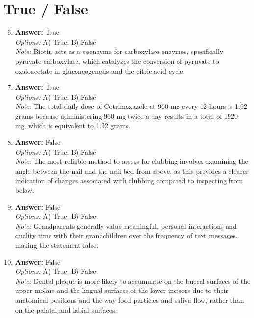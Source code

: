 \documentclass[12pt]{article}
\begin{document}
\section*{True / False}
\begin{enumerate}[label=\arabic*.]
\setcounter{enumi}{5}
\item \textbf{Answer:} True
\\ \textit{Options:} A) True; B) False
\\ \textit{Note:} Biotin acts as a coenzyme for carboxylase enzymes, specifically pyruvate carboxylase, which catalyzes the conversion of pyruvate to oxaloacetate in gluconeogenesis and the citric acid cycle.
\item \textbf{Answer:} True
\\ \textit{Options:} A) True; B) False
\\ \textit{Note:} The total daily dose of Cotrimoxazole at 960 mg every 12 hours is 1.92 grams because administering 960 mg twice a day results in a total of 1920 mg, which is equivalent to 1.92 grams.
\item \textbf{Answer:} False
\\ \textit{Options:} A) True; B) False
\\ \textit{Note:} The most reliable method to assess for clubbing involves examining the angle between the nail and the nail bed from above, as this provides a clearer indication of changes associated with clubbing compared to inspecting from below.
\item \textbf{Answer:} False
\\ \textit{Options:} A) True; B) False
\\ \textit{Note:} Grandparents generally value meaningful, personal interactions and quality time with their grandchildren over the frequency of text messages, making the statement false.
\item \textbf{Answer:} False
\\ \textit{Options:} A) True; B) False
\\ \textit{Note:} Dental plaque is more likely to accumulate on the buccal surfaces of the upper molars and the lingual surfaces of the lower incisors due to their anatomical positions and the way food particles and saliva flow, rather than on the palatal and labial surfaces.
\end{enumerate}
\end{document}
